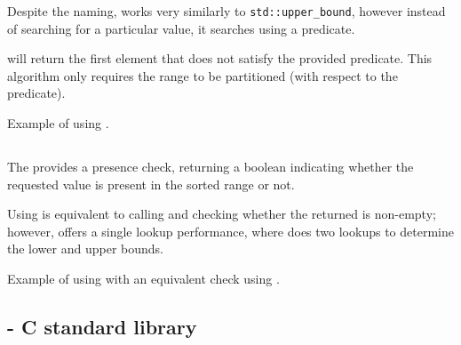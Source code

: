 Despite the naming,  works very similarly to \texttt{std::upper\-\_bound}, however instead of searching for a particular value, it searches using a predicate.


 will return the first element that does not satisfy the provided predicate. This algorithm only requires the range to be partitioned (with respect to the predicate).

\begin{codebox}[]{\href{https://compiler-explorer.com/z/WTzs4zYTq}{\ExternalLink}}
\footnotesize Example of using .
\tcblower
{}
\end{codebox}

\subsection{\texorpdfstring{}{\texttt{std::binary\_search}}}

The  provides a presence check, returning a boolean indicating whether the requested value is present in the sorted range or not.


Using  is equivalent to calling  and checking whether the returned is non-empty; however,  offers a single lookup performance, where  does two lookups to determine the lower and upper bounds.

\begin{codebox}[]{\href{https://compiler-explorer.com/z/7fP71Kjvx}{\ExternalLink}}
\footnotesize Example of using  with an equivalent check using .
\tcblower
{}
\end{codebox}

\subsection{\texorpdfstring{ - C standard library}{\texttt{bsearch} - C standard library}}

